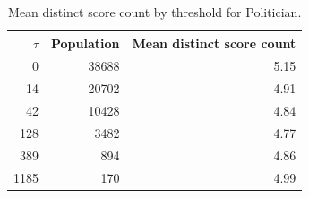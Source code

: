 \begin{table}[htbp]
\centering
\small
\begin{tabular}{r r r}
\hline
$\tau$ & Population & Mean distinct score count \\
\hline
0 & 38688 & 5.15 \\
14 & 20702 & 4.91 \\
42 & 10428 & 4.84 \\
128 & 3482 & 4.77 \\
389 & 894 & 4.86 \\
1185 & 170 & 4.99 \\
\hline
\end{tabular}
\caption{Mean distinct score count by threshold for Politician.}
\label{tab:mean-size-Politician}
\end{table}
